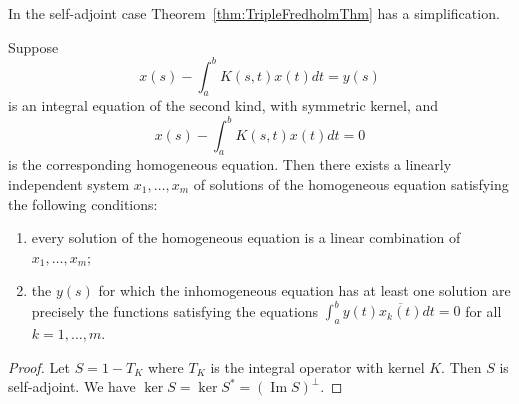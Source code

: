 In the self-adjoint case Theorem~\ref{thm:TripleFredholmThm} has a simplification.
\begin{proposition}[Fredholm]
	\label{prop:FredholmSA}
	Suppose
	\[
		x(s)-\int_a^b K(s, t) x(t) d t=y(s)
	\]
	is an integral equation of the second kind, with symmetric kernel, and 
\[
		x(s)-\int_a^b K(s, t) x(t) d t=0
	\]
	is the corresponding homogeneous equation. Then there exists a linearly independent system $x_1, \ldots, x_m$ of solutions of the homogeneous equation satisfying the following conditions:
	\begin{enumerate}
		\item every solution of the homogeneous equation is a linear combination of $x_1, \ldots, x_m$;
		\item the $y(s)$ for which the inhomogeneous equation has at least one solution are precisely the functions satisfying the equations $\int _a^b y(t) \overline{x_k(t)} dt = 0 $ for all $k = 1, \ldots, m$.
	\end{enumerate}
\end{proposition}
\begin{proof}
	Let $S = 1 - T_K$ where  $T_K$ is the integral operator with kernel $K$. Then $S$ is self-adjoint. We have
	$\operatorname{ker} S = \operatorname{ker} S^* = \left( \operatorname{Im} S \right) ^\perp$.
\end{proof}






